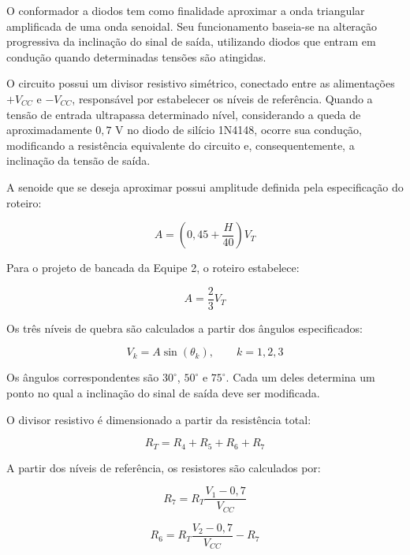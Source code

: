 \documentclass[11pt,a4paper]{article}
\begin{document}
O conformador a diodos tem como finalidade aproximar a onda triangular amplificada de uma onda senoidal. Seu funcionamento baseia-se na alteração progressiva da inclinação do sinal de saída, utilizando diodos que entram em condução quando determinadas tensões são atingidas.

O circuito possui um divisor resistivo simétrico, conectado entre as alimentações $+V_{CC}$ e $-V_{CC}$, responsável por estabelecer os níveis de referência. Quando a tensão de entrada ultrapassa determinado nível, considerando a queda de aproximadamente $0,7$ V no diodo de silício 1N4148, ocorre sua condução, modificando a resistência equivalente do circuito e, consequentemente, a inclinação da tensão de saída.

A senoide que se deseja aproximar possui amplitude definida pela especificação do roteiro:

\begin{equation}
A=\left(0,45+\frac{H}{40}\right)V_T
\end{equation}

Para o projeto de bancada da Equipe 2, o roteiro estabelece:

\begin{equation}
A=\frac{2}{3}V_T
\end{equation}

Os três níveis de quebra são calculados a partir dos ângulos especificados:

\begin{equation}
V_k=A\sin(\theta_k), \qquad k=1,2,3
\label{eq:limiares_conformador}
\end{equation}

Os ângulos correspondentes são $30^\circ$, $50^\circ$ e $75^\circ$. Cada um deles determina um ponto no qual a inclinação do sinal de saída deve ser modificada.

O divisor resistivo é dimensionado a partir da resistência total:

\begin{equation}
R_T=R_4+R_5+R_6+R_7
\end{equation}

A partir dos níveis de referência, os resistores são calculados por:

\begin{equation}
R_7=R_T\frac{V_1-0,7}{V_{CC}}
\end{equation}

\begin{equation}
R_6=R_T\frac{V_2-0,7}{V_{CC}}-R_7
\end{equation}
\end{document}
